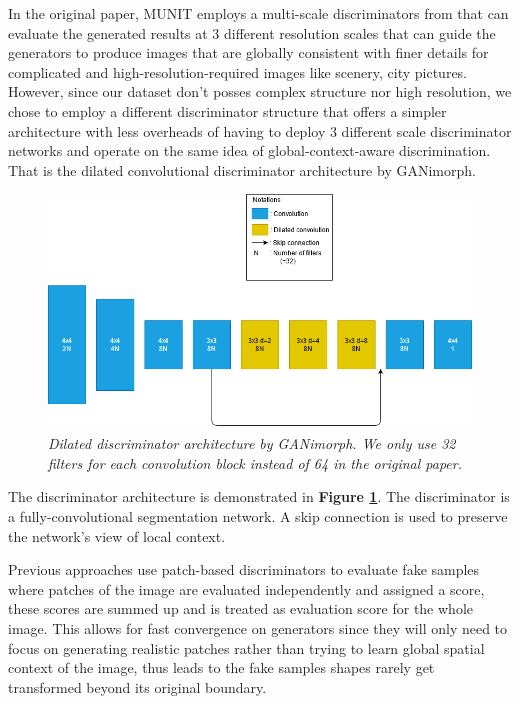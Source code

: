 \documentclass[12pt]{report}
\begin{document}
In the original paper, MUNIT \cite{munit} employs a multi-scale discriminators from \cite{multi-scale-discri} that can evaluate the generated results at 3 different resolution scales that can guide the generators to produce images that are globally consistent with finer details for complicated and high-resolution-required images like scenery, city pictures. However, since our dataset don't posses complex structure nor high resolution, we chose to employ a different discriminator structure that offers a simpler architecture with less overheads of having to deploy 3 different scale discriminator networks and operate on the same idea of global-context-aware discrimination. That is the dilated convolutional discriminator architecture by GANimorph\cite{ganimorph}. 

\begin{figure}[h]
	\centering
	\includegraphics[scale=0.6]{discri-architecture}
	\caption{\textit{Dilated discriminator architecture by GANimorph\cite{ganimorph}. We only use 32 filters for each convolution block instead of 64 in the original paper.}}
	\label{fig:discri-architecture}
\end{figure}

The discriminator architecture is demonstrated in \textbf{Figure \ref{fig:discri-architecture}}. The discriminator is a fully-convolutional segmentation network. A skip connection is used to preserve the network's view of local context.

Previous approaches \cite{cycle-gan}\cite{disco-gan} use patch-based discriminators to evaluate fake samples where patches of the image are evaluated independently and assigned a score, these scores are summed up and is treated as evaluation score for the whole image. This allows for fast convergence on generators since they will only need to focus on generating realistic patches rather than trying to learn global spatial context of the image, thus leads to the fake samples shapes rarely get transformed beyond its original boundary.
\end{document}
